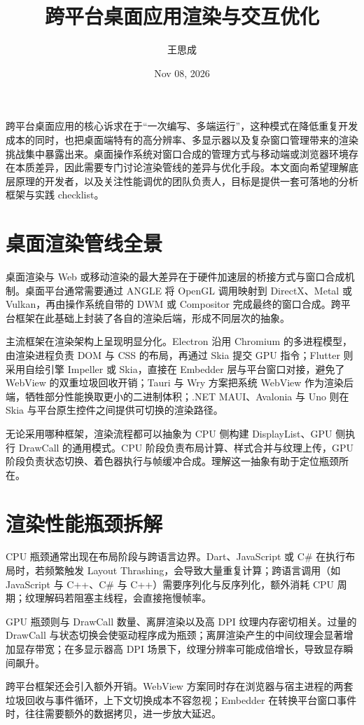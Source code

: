 \title{跨平台桌面应用渲染与交互优化}
\author{王思成}
\date{Nov 08, 2026}
\maketitle
跨平台桌面应用的核心诉求在于“一次编写、多端运行”，这种模式在降低重复开发成本的同时，也把桌面端特有的高分辨率、多显示器以及复杂窗口管理带来的渲染挑战集中暴露出来。桌面操作系统对窗口合成的管理方式与移动端或浏览器环境存在本质差异，因此需要专门讨论渲染管线的差异与优化手段。本文面向希望理解底层原理的开发者，以及关注性能调优的团队负责人，目标是提供一套可落地的分析框架与实践 checklist。\par
\chapter{桌面渲染管线全景}
桌面渲染与 Web 或移动渲染的最大差异在于硬件加速层的桥接方式与窗口合成机制。桌面平台通常需要通过 ANGLE 将 OpenGL 调用映射到 DirectX、Metal 或 Vulkan，再由操作系统自带的 DWM 或 Compositor 完成最终的窗口合成。跨平台框架在此基础上封装了各自的渲染后端，形成不同层次的抽象。\par
主流框架在渲染架构上呈现明显分化。Electron 沿用 Chromium 的多进程模型，由渲染进程负责 DOM 与 CSS 的布局，再通过 Skia 提交 GPU 指令；Flutter 则采用自绘引擎 Impeller 或 Skia，直接在 Embedder 层与平台窗口对接，避免了 WebView 的双重垃圾回收开销；Tauri 与 Wry 方案把系统 WebView 作为渲染后端，牺牲部分性能换取更小的二进制体积；.NET MAUI、Avalonia 与 Uno 则在 Skia 与平台原生控件之间提供可切换的渲染路径。\par
无论采用哪种框架，渲染流程都可以抽象为 CPU 侧构建 DisplayList、GPU 侧执行 DrawCall 的通用模式。CPU 阶段负责布局计算、样式合并与纹理上传，GPU 阶段负责状态切换、着色器执行与帧缓冲合成。理解这一抽象有助于定位瓶颈所在。\par
\chapter{渲染性能瓶颈拆解}
CPU 瓶颈通常出现在布局阶段与跨语言边界。Dart、JavaScript 或 C\#{} 在执行布局时，若频繁触发 Layout Thrashing，会导致大量重复计算；跨语言调用（如 JavaScript 与 C++、C\#{} 与 C++）需要序列化与反序列化，额外消耗 CPU 周期；纹理解码若阻塞主线程，会直接拖慢帧率。\par
GPU 瓶颈则与 DrawCall 数量、离屏渲染以及高 DPI 纹理内存密切相关。过量的 DrawCall 与状态切换会使驱动程序成为瓶颈；离屏渲染产生的中间纹理会显著增加显存带宽；在多显示器高 DPI 场景下，纹理分辨率可能成倍增长，导致显存瞬间飙升。\par
跨平台框架还会引入额外开销。WebView 方案同时存在浏览器与宿主进程的两套垃圾回收与事件循环，上下文切换成本不容忽视；Embedder 在转换平台窗口事件时，往往需要额外的数据拷贝，进一步放大延迟。\par
